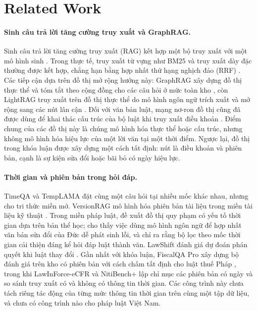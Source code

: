 \documentclass[11pt,a4paper]{article}
\begin{document}
\section{Related Work}

\paragraph{Sinh câu trả lời tăng cường truy xuất và GraphRAG.} Sinh câu trả lời tăng cường truy xuất (RAG) kết hợp một bộ truy xuất với một mô hình sinh \citep{lewis2020rag}. Trong thực tế, truy xuất từ vựng như BM25 \citep{robertson2009bm25} và truy xuất dày đặc \citep{karpukhin2020dpr} thường được kết hợp, chẳng hạn bằng hợp nhất thứ hạng nghịch đảo (RRF) \citep{cormack2009rrf}. Các tiếp cận dựa trên đồ thị mở rộng hướng này: GraphRAG xây dựng đồ thị thực thể và tóm tắt theo cộng đồng cho các câu hỏi ở mức toàn kho \citep{edge2024graphrag}, còn LightRAG truy xuất trên đồ thị thực thể do mô hình ngôn ngữ trích xuất và mở rộng sang các nút lân cận \citep{guo2025lightrag}. Đối với văn bản luật, mạng nơ-ron đồ thị cũng đã được dùng để khai thác cấu trúc của bộ luật khi truy xuất điều khoản \citep{louis2023finding}. Điểm chung của các đồ thị này là chúng mô hình hóa thực thể hoặc cấu trúc, nhưng không mô hình hóa hiệu lực của một lời văn tại một thời điểm. Ngược lại, đồ thị trong khóa luận được xây dựng một cách tất định: nút là điều khoản và phiên bản, cạnh là sự kiện sửa đổi hoặc bãi bỏ có ngày hiệu lực.

\paragraph{Thời gian và phiên bản trong hỏi đáp.} TimeQA \citep{chen2021timeqa} và TempLAMA \citep{dhingra2022templama} đặt cùng một câu hỏi tại nhiều mốc khác nhau, nhưng cho tri thức miền mở. VersionRAG mô hình hóa phiên bản tài liệu trong miền tài liệu kỹ thuật \citep{huwiler2025versionrag}. Trong miền pháp luật, \citet{demartim2025satgraph} đề xuất đồ thị quy phạm có yếu tố thời gian dựa trên bản thể học; \citet{prior2025consolidation} cho thấy việc dùng mô hình ngôn ngữ để hợp nhất văn bản sửa đổi của Đức dễ phát sinh lỗi, và \citet{prior2026oldfriend} chỉ ra rằng bộ lọc theo mốc thời gian cải thiện đáng kể hỏi đáp luật thành văn. LawShift đánh giá dự đoán phán quyết khi luật thay đổi \citep{han2025lawshift}. Gần nhất với khóa luận, FiscalQA Pro xây dựng bộ đánh giá trên kho có phiên bản với cách chấm tất định cho luật thuế Pháp \citep{cymbler2026fiscalqa}, trong khi LawInForce-eCFR \citep{yao2026lawinforce} và NitiBench+ \citep{akarajaradwong2026nitibenchplus} lập chỉ mục các phiên bản có ngày và so sánh truy xuất có và không có thông tin thời gian. Các công trình này chưa tách riêng tác động của từng mức thông tin thời gian trên cùng một tập dữ liệu, và chưa có công trình nào cho pháp luật Việt Nam.
\end{document}
